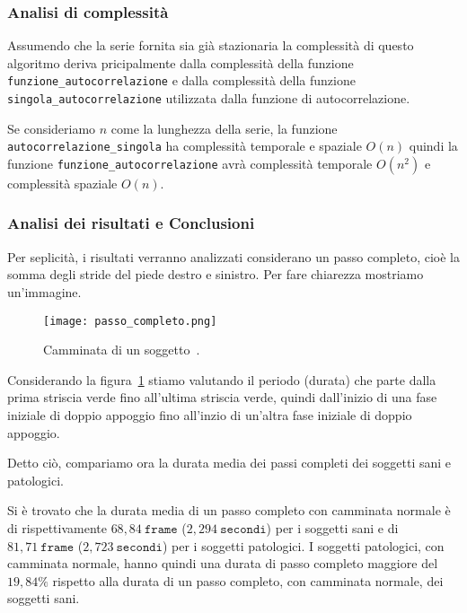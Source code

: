 \subsubsection{Analisi di complessità}
\begin{sloppypar}
Assumendo che la serie fornita sia già stazionaria la complessità di questo algoritmo 
deriva pricipalmente dalla complessità della funzione \texttt{funzione\_autocorrelazione} e dalla complessità
della funzione \texttt{singola\_autocorrelazione} utilizzata dalla funzione di autocorrelazione.

Se consideriamo $n$ come la lunghezza della serie, 
la funzione \texttt{autocorrelazione\_singola} ha complessità temporale e spaziale $O(n)$ quindi
la funzione \texttt{funzione\_autocorrelazione} avrà complessità temporale $O(n^2)$ e complessità
spaziale $O(n)$.
\end{sloppypar}


\subsubsection{Analisi dei risultati e Conclusioni}
Per seplicità, i risultati verranno analizzati considerano un passo completo, cioè la somma degli stride
del piede destro e sinistro. Per fare chiarezza mostriamo un'immagine.
\begin{figure}[H]
    \centering
    \texttt{[image: passo\_completo.png]}
    \caption{Camminata di un soggetto~\cite{cf:passo_completo}.}
    \label{fig:passo_completo}
\end{figure}
Considerando la figura~\ref*{fig:passo_completo} stiamo valutando il periodo (durata) che parte dalla prima striscia
verde fino all'ultima striscia verde, quindi dall'inizio di una fase iniziale di doppio appoggio fino all'inzio
di un'altra fase iniziale di doppio appoggio.

\begin{sloppypar}
Detto ciò, compariamo ora la durata media dei passi completi dei soggetti sani e patologici. 

Si è trovato che la durata media di un passo completo con camminata normale è di rispettivamente $68,84 \ \texttt{frame}$
($2,294 \ \texttt{secondi}$) per i soggetti sani e di 
$81,71 \ \texttt{frame}$ ($2,723 \ \texttt{secondi}$) per i soggetti patologici.
I soggetti patologici, con camminata normale, hanno quindi una durata di passo completo maggiore del 
$19,84\%$ rispetto alla durata di un passo completo, con camminata normale, dei soggetti sani.
\end{sloppypar}

